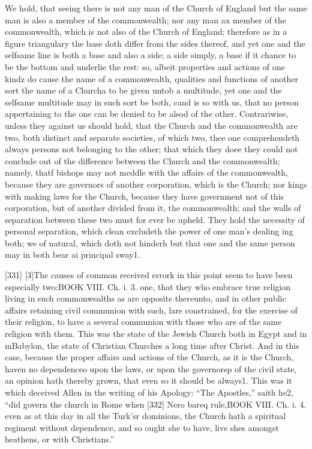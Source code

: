 We hold, that seeing there is not any man of the Church of England but the same man is also a member of the commonwealth; nor any man ax member of the commonwealth, which is not also of the Church of England; therefore as in a figure triangulary the base doth differ from the sides thereof, and yet one and the selfsame line is both a base and also a side; a side simply, a base if it chance to be the bottom and underlie the rest: so, albeit properties and actions of one kindz do cause the name of a commonwealth, qualities and functions of another sort the name of a Churcha to be given untob a multitude, yet one and the selfsame multitude may in such sort be both, cand is so with us, that no person appertaining to the one can be denied to be alsod of the other. Contrariwise, unless they against us should hold, that the Church and the commonwealth are two, both distinct and separate societies, of which two, thee one comprehendeth always persons not belonging to the other; that which they doee they could not conclude out of the difference between the Church and the commonwealth; namely, thatf bishops may not meddle with the affairs of the commonwealth, because they are governors of another corporation, which is the Church; nor kings with making laws for the Church, because they have government not of this corporation, but of another divided from it, the commonwealth; and the walls of separation between these two must for ever be upheld. They hold the necessity of personal separation, which clean excludeth the power of one man’s dealing ing both; we of natural, which doth not hinderh but that one and the same person may in both bear ai principal sway1.

[331]
[3]The causes of common received errork in this point seem to have been especially two:BOOK VIII. Ch. i. 3. one, that they who embrace true religion living in such commonwealths as are opposite thereunto, and in other public affairs retaining civil communion with such, lare constrained, for the exercise of their religion, to have a several communion with those who are of the same religion with them. This was the state of the Jewish Church both in Egypt and in mBabylon, the state of Christian Churches a long time after Christ. And in this case, because the proper affairs and actions of the Church, as it is the Church, haven no dependenceo upon the laws, or upon the governorsp of the civil state, an opinion hath thereby grown, that even so it should be always1. This was it which deceived Allen in the writing of his Apology: “The Apostles,” saith he2, “did govern the church in Rome when [332] Nero bareq rule,BOOK VIII. Ch. i. 4. even as at this day in all the Turk’sr dominions, the Church hath a spiritual regiment without dependence, and so ought she to have, live shes amongst heathens, or with Christians.”

